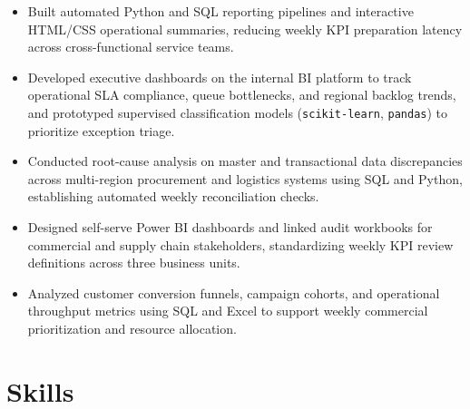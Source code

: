 \begin{itemize}\setlength{\itemsep}{0.08em}\setlength{\parskip}{0pt}\setlength{\topsep}{0.1em}
  \item Built automated Python and SQL reporting pipelines and interactive HTML/CSS operational summaries, reducing weekly KPI preparation latency across cross-functional service teams.
  \item Developed executive dashboards on the internal BI platform to track operational SLA compliance, queue bottlenecks, and regional backlog trends, and prototyped supervised classification models (\texttt{scikit-learn}, \texttt{pandas}) to prioritize exception triage.
\end{itemize}

\begin{itemize}\setlength{\itemsep}{0.08em}\setlength{\parskip}{0pt}\setlength{\topsep}{0.1em}
  \item Conducted root-cause analysis on master and transactional data discrepancies across multi-region procurement and logistics systems using SQL and Python, establishing automated weekly reconciliation checks.
  \item Designed self-serve Power BI dashboards and linked audit workbooks for commercial and supply chain stakeholders, standardizing weekly KPI review definitions across three business units.
\end{itemize}

\begin{itemize}\setlength{\itemsep}{0.08em}\setlength{\parskip}{0pt}\setlength{\topsep}{0.1em}
  \item Analyzed customer conversion funnels, campaign cohorts, and operational throughput metrics using SQL and Excel to support weekly commercial prioritization and resource allocation.
\end{itemize}

\section*{Skills}
